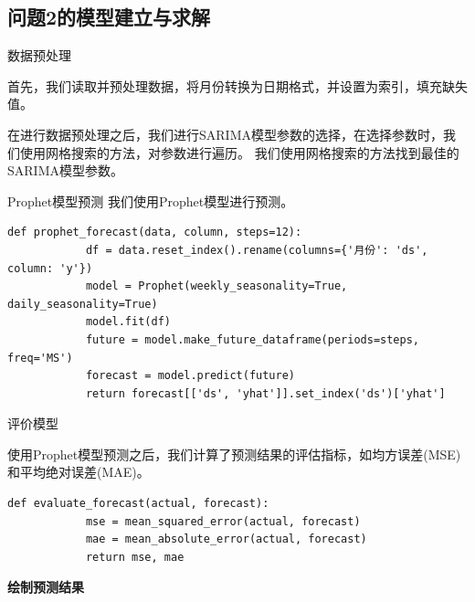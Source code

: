 \documentclass[a4paper]{article}
\begin{document}
	\subsection{问题2的模型建立与求解}
	数据预处理

	首先，我们读取并预处理数据，将月份转换为日期格式，并设置为索引，填充缺失值。

	在进行数据预处理之后，我们进行SARIMA模型参数的选择，在选择参数时，我们使用网格搜索的方法，对参数进行遍历。
	我们使用网格搜索的方法找到最佳的SARIMA模型参数。

	Prophet模型预测
	我们使用Prophet模型进行预测。
	\begin{lstlisting}[caption={Python Example}, label={lst:example}]
		def prophet_forecast(data, column, steps=12):
			df = data.reset_index().rename(columns={'月份': 'ds', column: 'y'})
			model = Prophet(weekly_seasonality=True, daily_seasonality=True)
			model.fit(df)
			future = model.make_future_dataframe(periods=steps, freq='MS')
			forecast = model.predict(future)
			return forecast[['ds', 'yhat']].set_index('ds')['yhat']
	\end{lstlisting}
	评价模型

	使用Prophet模型预测之后，我们计算了预测结果的评估指标，如均方误差(MSE)和平均绝对误差(MAE)。
	\begin{lstlisting}[caption={Python Example}, label={lst:example}]
		def evaluate_forecast(actual, forecast):
			mse = mean_squared_error(actual, forecast)
			mae = mean_absolute_error(actual, forecast)
			return mse, mae

	\end{lstlisting}

	\textbf{绘制预测结果}
\end{document}
